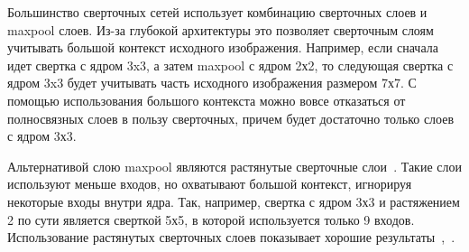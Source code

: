 Большинство сверточных сетей использует комбинацию сверточных слоев и maxpool слоев. Из-за глубокой архитектуры это позволяет сверточным слоям учитывать большой контекст исходного изображения. Например, если сначала идет свертка с ядром 3x3, а затем maxpool с ядром 2х2, то следующая свертка с ядром 3x3 будет учитывать часть исходного изображения размером 7х7. С помощью использования большого контекста можно вовсе отказаться от полносвязных слоев в пользу сверточных, причем будет достаточно только слоев с ядром 3х3.

Альтернативой слою maxpool являются растянутые сверточные слои~\cite{dilated_conv}. Такие слои используют меньше входов, но охватывают большой контекст, игнорируя некоторые входы внутри ядра. Так, например, свертка с ядром 3х3 и растяжением 2 по сути является сверткой 5х5, в которой используется только 9 входов. Использование растянутых сверточных слоев показывает хорошие результаты~\cite{segm_dcnn_crf},~\cite{deeplab}.


\iffalse
\subsection{DeepLab}
\fi
